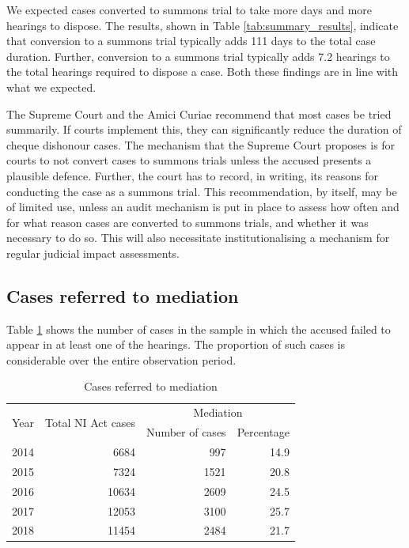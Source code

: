 \documentclass[12pt,a4paper]{article}
\begin{document}
We expected cases converted to summons trial to take more days and more hearings to dispose. The results, shown in Table \ref{tab:summary_results}, indicate that conversion to a summons trial typically adds 111 days to the total case duration. Further, conversion to a summons trial typically adds 7.2 hearings to the total hearings required to dispose a case. Both these findings are in line with what we expected.

The Supreme Court and the Amici Curiae recommend that most cases be tried summarily. If courts implement this, they can significantly reduce the duration of cheque dishonour cases. The mechanism that the Supreme Court proposes is for courts to not convert cases to summons trials unless the accused presents a plausible defence. Further, the court has to record, in writing, its reasons for conducting the case as a summons trial. This recommendation, by itself, may be of limited use, unless an audit mechanism is put in place to assess how often and for what reason cases are converted to summons trials, and whether it was necessary to do so. This will also necessitate institutionalising a mechanism for regular judicial impact assessments.

\subsection{Cases referred to mediation}
\label{sec:mediation}

Table \ref{tab:mediation_yearWise} shows the number of cases in the sample in which the accused failed to appear in at least one of the hearings. The proportion of such cases is considerable over the entire observation period.

\begin{longtable}{@{}lrrr@{}}
 \caption{Cases referred to mediation}\label{tab:mediation_yearWise}\\
 \toprule
 \multirow{2}{*}{Year} & \multirow{2}{*}{Total NI Act cases} & \multicolumn{2}{c}{Mediation}\\
 \cmidrule{3-4}
 && Number of cases & Percentage \\
 \midrule\endhead
 2014 & 6684 & 997 & 14.9 \\
 2015 & 7324 & 1521 & 20.8 \\
 2016 & 10634 & 2609 & 24.5 \\
 2017 & 12053 & 3100 & 25.7 \\
 2018 & 11454 & 2484 & 21.7 \\
 \bottomrule
\end{longtable}
\end{document}
